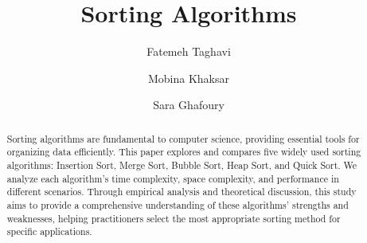 \documentclass[sigplan,screen]{acmart}
\begin{document}
\title{Sorting Algorithms}





\author{Fatemeh Taghavi}

\author{Mobina Khaksar}

\author{Sara Ghafoury}

\renewcommand{\shortauthors}{Taghavi et al.}

\begin{abstract}
  Sorting algorithms are fundamental to computer science, providing
  essential tools for organizing data efficiently. This paper explores
  and compares five widely used sorting algorithms: Insertion Sort, 
  Merge Sort, Bubble Sort, Heap Sort, and Quick Sort. We analyze each 
  algorithm's time complexity, space complexity, and performance in 
  different scenarios. Through empirical analysis and theoretical 
  discussion, this study aims to provide a comprehensive understanding 
  of these algorithms' strengths and weaknesses, helping practitioners 
  select the most appropriate sorting method for specific applications.
\end{abstract}


\end{document}
